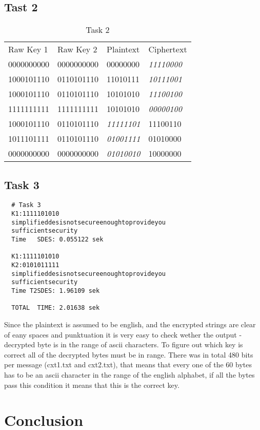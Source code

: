 \documentclass[12pt]{report}
\begin{document}
\subsection*{Tast 2}
\begin{table}[h]
  \centering
  \caption{Task 2}
  \begin{tabular}{|llll|}
    \hline
     Raw Key 1 & Raw Key 2 & Plaintext & Ciphertext \\
  0000000000 &0000000000 &00000000 & \emph{11110000}  \\ 
  1000101110 &0110101110 &11010111 & \emph{10111001}  \\ 
  1000101110 &0110101110 &10101010 & \emph{11100100}  \\ 
  1111111111 &1111111111 &10101010 & \emph{00000100}  \\ 
  1000101110 &0110101110 & \emph{11111101} & 11100110 \\ 
  1011101111 &0110101110 & \emph{01001111} & 01010000 \\ 
  0000000000 &0000000000 & \emph{01010010} & 10000000 \\ \hline
  \end{tabular}
  \end{table}
\newpage
\subsection*{Task 3}

\begin{lstlisting}
  # Task 3
  K1:1111101010
  simplifieddesisnotsecureenoughtoprovideyou
  sufficientsecurity
  Time   SDES: 0.055122 sek

  K1:1111101010
  K2:0101011111
  simplifieddesisnotsecureenoughtoprovideyou
  sufficientsecurity
  Time T2SDES: 1.96109 sek

  TOTAL  TIME: 2.01638 sek
\end{lstlisting}

Since the plaintext is assumed to be english, and the encrypted strings are clear of eany spaces and punktuation it is very easy to check wether the output - decrypted byte is in the range of ascii characters. To figure out which key is correct all of the decrypted bytes must be in range. There was in total 480 bits per message (cxt1.txt and cxt2.txt), that means that every one of the 60 bytes has to be an ascii character in the range of the english alphabet, if all the bytes pass this condition it means that this is the correct key.

\section*{Conclusion}
\end{document}
